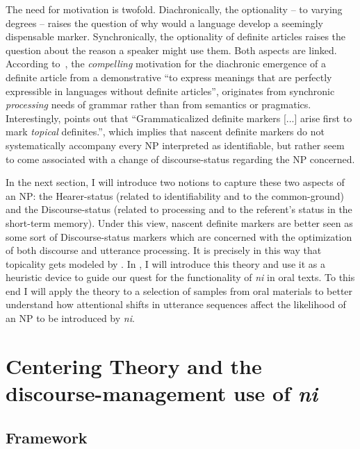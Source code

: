 \documentclass[output=paper
,modfonts
,nonflat]{langsci/langscibook}
\begin{document}
The need for motivation is twofold. Diachronically, the optionality -- to varying degrees -- raises the question of why would a language develop a seemingly dispensable marker. Synchronically, the optionality of definite articles raises the question about the reason a speaker might use them. Both aspects are linked. According to~\citet[84]{Hawkins2004}, the \textit{compelling} motivation for the diachronic emergence of a definite article from a demonstrative ``to express meanings that are perfectly expressible in languages without definite articles'', originates from synchronic \textit{processing} needs of grammar rather than from semantics or pragmatics. Interestingly, \citet[474]{Givon2001} points out that ``Grammaticalized definite markers [...] arise first to mark \textit{topical} definites.'', which implies that nascent definite markers do not systematically accompany every NP interpreted as identifiable, but rather seem to come associated with a change of discourse-status regarding the NP concerned. 

In the next section, I will introduce two notions to capture these two aspects of an NP: the Hearer-status (related to identifiability and to the common-ground) and the Discourse-status (related to processing and to the referent's status in the short-term memory). Under this view, nascent definite markers are better seen as some sort of Discourse-status markers which are concerned with the optimization of both discourse and utterance processing. It is precisely in this way that topicality gets modeled by . In , I will introduce this theory and use it as a heuristic device to guide our quest for the functionality of \textit{ni} in oral texts. To this end I will apply the theory to a selection of samples from oral materials to better understand how attentional shifts in utterance sequences \largerpage affect the likelihood of an NP to be introduced by \textit{ni}.

\section{Centering Theory and the discourse-management use of \textit{ni}}\label{sec:pico:3} 

\subsection{Framework}\label{sec:pico:3.1} 
\end{document}
